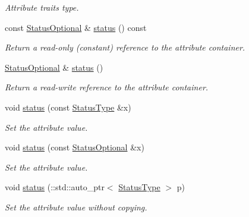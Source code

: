 \begin{DoxyCompactItemize}
\begin{DoxyCompactList}\small\item\em Attribute traits type. \item\end{DoxyCompactList}\item 
const \hyperlink{classopenstack_1_1xml_1_1Server_a68b70c69e4ffbd43b5700bd382ab7172}{StatusOptional} \& \hyperlink{classopenstack_1_1xml_1_1Server_a68cd53b0baa4c4eae4d332a2a4c69e8a}{status} () const 
\begin{DoxyCompactList}\small\item\em Return a read-\/only (constant) reference to the attribute container. \item\end{DoxyCompactList}\item 
\hyperlink{classopenstack_1_1xml_1_1Server_a68b70c69e4ffbd43b5700bd382ab7172}{StatusOptional} \& \hyperlink{classopenstack_1_1xml_1_1Server_af3e2a6d3255ebd50edfc5a453e2ca9e9}{status} ()
\begin{DoxyCompactList}\small\item\em Return a read-\/write reference to the attribute container. \item\end{DoxyCompactList}\item 
void \hyperlink{classopenstack_1_1xml_1_1Server_a6be0b2aee033edfe80a92bdca7d1a2f3}{status} (const \hyperlink{classopenstack_1_1xml_1_1ServerStatus}{StatusType} \&x)
\begin{DoxyCompactList}\small\item\em Set the attribute value. \item\end{DoxyCompactList}\item 
void \hyperlink{classopenstack_1_1xml_1_1Server_a049ba04d637303755d146f0b2b80e0f1}{status} (const \hyperlink{classopenstack_1_1xml_1_1Server_a68b70c69e4ffbd43b5700bd382ab7172}{StatusOptional} \&x)
\begin{DoxyCompactList}\small\item\em Set the attribute value. \item\end{DoxyCompactList}\item 
void \hyperlink{classopenstack_1_1xml_1_1Server_aac1ddab3667cc8c3b83ddd32bdfd1494}{status} (::std::auto\_\-ptr$<$ \hyperlink{classopenstack_1_1xml_1_1ServerStatus}{StatusType} $>$ p)
\begin{DoxyCompactList}\small\item\em Set the attribute value without copying. \item\end{DoxyCompactList}\end{DoxyCompactItemize}
